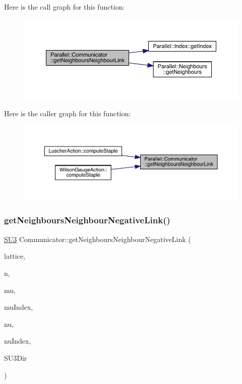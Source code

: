 Here is the call graph for this function\+:
\nopagebreak
\begin{figure}[H]
\begin{center}
\leavevmode
\includegraphics[width=350pt]{class_parallel_1_1_communicator_a27862560cf6c7b8ccf650a422e014776_cgraph}
\end{center}
\end{figure}
Here is the caller graph for this function\+:
\nopagebreak
\begin{figure}[H]
\begin{center}
\leavevmode
\includegraphics[width=350pt]{class_parallel_1_1_communicator_a27862560cf6c7b8ccf650a422e014776_icgraph}
\end{center}
\end{figure}
\mbox{\label{class_parallel_1_1_communicator_a1c598fae96e05e3b36db368e60453d63}} 
\subsubsection{\texorpdfstring{getNeighboursNeighbourNegativeLink()}{getNeighboursNeighbourNegativeLink()}}
{\footnotesize\ttfamily \mbox{\hyperlink{class_s_u3}{S\+U3}} Communicator\+::get\+Neighbours\+Neighbour\+Negative\+Link (\begin{DoxyParamCaption}\item[{\mbox{\hyperlink{class_lattice}{Lattice}}$<$ \mbox{\hyperlink{class_s_u3}{S\+U3}} $>$ $\ast$}]{lattice,  }\item[{std\+::vector$<$ int $>$}]{n,  }\item[{int}]{mu,  }\item[{int $\ast$}]{mu\+Index,  }\item[{int}]{nu,  }\item[{int $\ast$}]{nu\+Index,  }\item[{int}]{S\+U3\+Dir }\end{DoxyParamCaption})\hspace{0.3cm}{\ttfamily [static]}}


